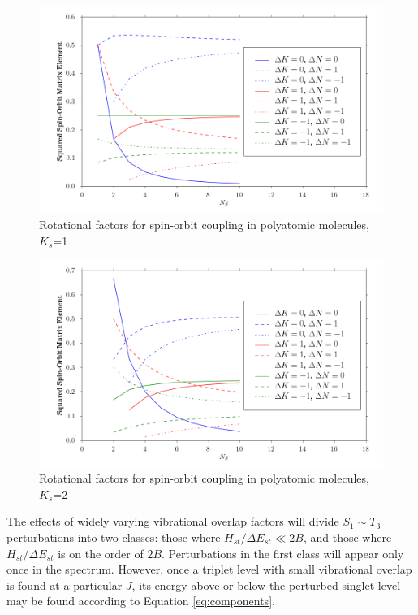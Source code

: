 \documentclass[12pt,draft]{mitthesis}
\begin{document}
\begin{figure}
  \caption{Rotational factors for spin-orbit coupling in polyatomic
    molecules, $K_s$=1}
  \label{fig:rotational-factors-1}
  \centering
  \includegraphics[width=6in]{rotational_factors_k1.png}
\end{figure}

\begin{figure}
  \caption{Rotational factors for spin-orbit coupling in polyatomic
    molecules, $K_s$=2}
  \label{fig:rotational-factors-2}
  \centering
  \includegraphics[width=6in]{rotational_factors_k2.png}
\end{figure}

The effects of widely varying vibrational overlap factors will divide
$S_1 \sim T_3$ perturbations into two classes: those where
$H_{st}/\Delta E_{st} \ll 2B$, and those where $H_{st} / \Delta
E_{st}$ is on the order of $2B$.  Perturbations in the first class
will appear only once in the spectrum.  However, once a triplet level
with small vibrational overlap is found at a particular $J$, its
energy above or below the perturbed singlet level may be found
according to Equation \ref{eq:components}.
\end{document}
